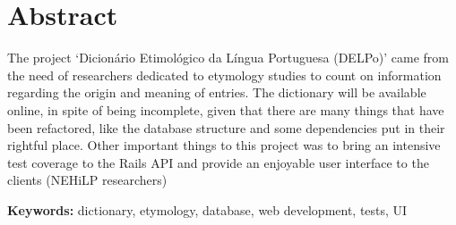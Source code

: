 \documentclass[12pt,twoside,a4paper,openany]{book}
\renewcommand{\chaptermark}[1]{\markboth{\MakeUppercase{#1}}{}}
\begin{document}
    \chapter*{Abstract}


    The project `Dicionário Etimológico da Língua Portuguesa (DELPo)' came from the need
    of researchers dedicated to etymology studies to count on information regarding the origin
    and meaning of entries.
    The dictionary will be available online, in spite of being incomplete, given that there are
    many things that have been refactored, like the database structure and some dependencies put
    in their rightful place.
    Other important things to this project was to bring an intensive test coverage to the Rails
    API and provide an enjoyable user interface to the clients (NEHiLP researchers)

    \noindent \textbf{Keywords:} dictionary, etymology, database, web development, tests, UI



    \dominitoc %
    \tableofcontents    %



    \dominilof \listoffigures \mtcaddchapter



    \mainmatter

    \fancyhead[RE,LO]{\thesection}

    \singlespacing              %


    
    
    
    
    

    \renewcommand{\chaptermark}[1]{\markboth{\MakeUppercase{\appendixname\ \thechapter}} {\MakeUppercase{#1}}}
    \fancyhead[RE,LO]{}
    \appendix

\end{document}
